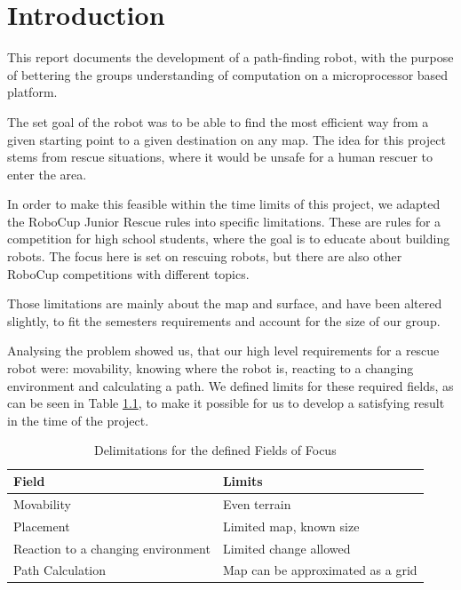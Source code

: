 \chapter{Introduction}\label{ch:introduction}

This report documents the development of a path-finding robot,
with the purpose of bettering the groups understanding of computation on a microprocessor based platform.

The set goal of the robot was to be able to find the most efficient way
from a given starting point to a given destination on any map.
The idea for this project stems from rescue situations,
where it would be unsafe for a human rescuer to enter the area.

In order to make this feasible within the time limits of this project,
we adapted the RoboCup Junior Rescue rules \cite{Robocup} into specific limitations.
These are rules for a competition for high school students,
where the goal is to educate about building robots.
The focus here is set on rescuing robots,
but there are also other RoboCup competitions with different topics.

Those limitations are mainly about the map and surface,
and have been altered slightly,
to fit the semesters requirements and account for the size of our group.

Analysing the problem showed us,
that our high level requirements for a rescue robot were:
movability,
knowing where the robot is,
reacting to a changing environment and
calculating a path.
We defined limits for these required fields, as can be seen in Table \ref{tab:limits},
to make it possible for us to develop a satisfying result in the time of the project. 

\begin{table}[h]
\centering
\begin{tabular}{|l|l|}
	\hline%
	Field 				& Limits							\\
	\hline%
	Movability			& Even terrain						\\
	Placement			& Limited map, known size			\\
	Reaction to a changing environment	& Limited change allowed			\\
	Path Calculation	& Map can be approximated as a grid	\\
	\hline%
\end{tabular}
\caption{Delimitations for the defined Fields of Focus}
\label{tab:limits}
\end{table}

